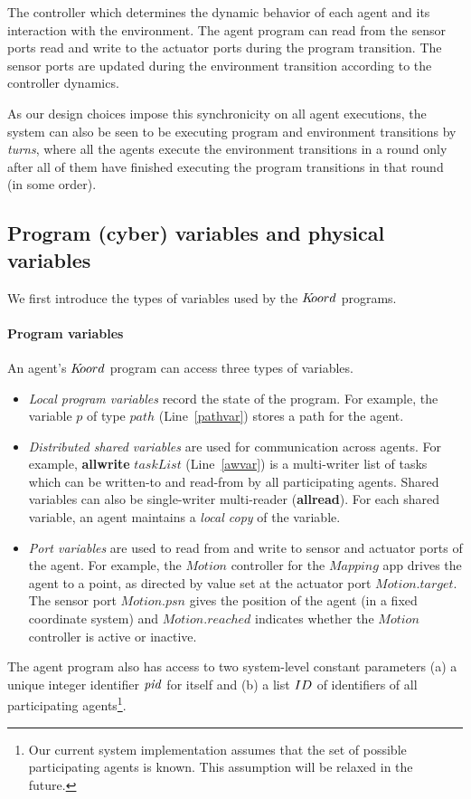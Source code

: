 The controller which determines the dynamic behavior of each agent and its interaction with the environment. The agent program can read from the sensor ports read and write to the actuator ports during the program transition. The sensor ports are updated during the environment transition according to the controller dynamics. 


As our design choices impose this synchronicity on all agent executions, the system can also be seen to be executing program and environment transitions by \emph{turns}, where all the agents execute the environment transitions in a round only after all of them have finished executing the program transitions in that round (in some order). 

 
\subsection{Program (cyber) variables and physical variables}
\label{sec:variables}
We first introduce the types of variables used by the $K\kern-2pt oord$ programs. 

\paragraph{Program variables}
An agent's $K\kern-2pt oord$ program can access three types of variables. 
%
\begin{itemize}
	\item {\em Local program variables\/} record the state of the program. For example, the variable $p$ of type $\mathit{path}$ (Line~\ref{pathvar}) stores a path for the agent. 
\item {\em Distributed shared variables\/} are used for communication across agents.  For example, {\bf allwrite} $\mathit{taskList}$ (Line~\ref{awvar}) is a multi-writer list of tasks which can be written-to and read-from by all participating agents. Shared variables can also be single-writer multi-reader ({\bf allread}). For each shared variable, an agent maintains a {\em local copy\/}  of the variable. 

\item {\em Port variables\/} are used to read from and write to sensor and actuator ports of the agent. For example, the $\mathit{Motion}$ controller for the $\mathit{Mapping}$ app  drives the agent  to a point, as directed by value set at the actuator port $\mathit{Motion.target}$. The sensor port $\mathit{Motion.psn}$ gives the position of the agent (in a fixed coordinate system) and $\mathit{Motion.reached}$ indicates  whether the $\mathit{Motion}$ controller is active or inactive.
\end{itemize}

The agent program also has access to two system-level constant parameters (a) a unique integer identifier $\mathit{pid}$ for itself and (b) a list $ID$ of identifiers of all participating agents\footnote{Our current system implementation assumes that the set of possible participating agents is known. This assumption will be relaxed in the future.}. 


